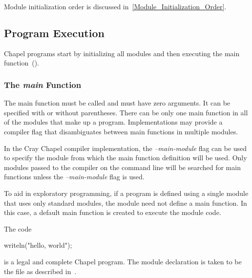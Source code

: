 Module initialization order is discussed
in~\ref{Module_Initialization_Order}.



\subsection{Program Execution}
\label{Program_Execution}

Chapel programs start by initializing all modules and then executing
the main function~().

\subsubsection{The {\em main} Function}
\label{The_main_Function}

The main function must be called  and must have zero
arguments.  It can be specified with or without parentheses.  There
can be only one main function in all of the modules that make up a
program.  Implementations may provide a compiler flag that
disambiguates between main functions in multiple modules.

\begin{craychapel}
In the Cray Chapel compiler implementation, the \emph{--main-module}
flag can be used to specify the module from which the main function
definition will be used.  Only modules passed to the compiler on the
command line will be searched for main functions unless
the \emph{--main-module} flag is used.
\end{craychapel}



To aid in exploratory programming, if a program is defined using a
single module that uses only standard modules, the module need not
define a main function.  In this case, a default main function is
created to execute the module code.
\begin{example}
The code
\begin{chapel}
writeln("hello, world");
\end{chapel}
is a legal and complete Chapel program.  The module declaration is
taken to be the file as described in~.
\end{example}


